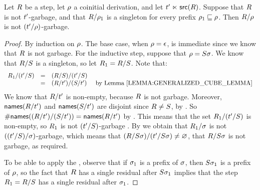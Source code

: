 \begin{lemma}
Let $R$ be a step, let $\rho$ a coinitial derivation,
and let $t' \mathrel{\ltimes} \mathsf{src}(R)$.
Suppose that $R$ is not $t'$-garbage,
and that $R / \rho_1$ is a singleton for every prefix $\rho_1 \sqsubseteq \rho$.
Then $R/\rho$ is not $(t'/\rho)$-garbage.
\end{lemma}
\begin{proof}
By induction on $\rho$.
The base case, when $\rho = \epsilon$, is immediate
since we know that $R$ is not garbage.
For the inductive step, suppose that $\rho = S\sigma$.
We know that $R/S$ is a singleton,
so let $R_1 = R/S$.
Note that:
\[
  \begin{array}{rcll}
  \redex_1/(\tm'/\redextwo)
  & = & (\redex/\redextwo)/(\tm'/\redextwo) \\
  & = & (\redex/\tm')/(\redextwo/\tm') & \text{ by \rlem{generalized_cube_lemma}} \\
  \end{array}
\]
We know that $R/t'$ is non-empty, because $R$ is not garbage.
Moreover, $\mathsf{names}(R/t')$ and $\mathsf{names}(S/t')$ are disjoint
since $R \neq S$, by .
So $\#\mathsf{names}((R/t')/(S/t')) = \mathsf{names}(R/t')$ by .
This means that the set $R_1/(t'/S)$ is non-empty,
so $R_1$ is not $(t'/S)$-garbage .
By \ih we obtain that $R_1/\sigma$ is not $((t'/S)/\sigma)$-garbage,
which means that
$(R/S\sigma)/(t'/S\sigma) \neq \varnothing$,
\ie that $R/S\sigma$ is not garbage, as required.

To be able to apply the \ih, observe that if $\sigma_1$ is a prefix of $\sigma$,
then $S\sigma_1$ is a prefix of $\rho$,
so the fact that $R$ has a single residual after $S\sigma_1$
implies that the step $R_1 = R/S$ has a single residual after $\sigma_1$.
\end{proof}

